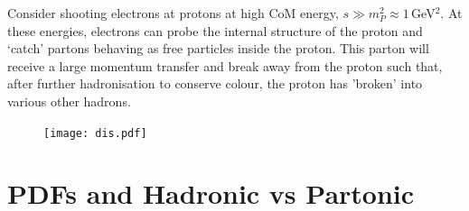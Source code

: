 \documentclass[relqm.tex]{subfiles}
\begin{document}
Consider shooting electrons at protons at high CoM energy, $s\gg m_P^2\approx 1\,$GeV$^2$.
At these energies, electrons can probe the internal structure of the proton and `catch' partons behaving as free particles inside the proton. 
This parton will receive a large momentum transfer and break away from the proton such that, after further hadronisation to conserve colour, the proton has 'broken' into various other hadrons. 
\begin{figure}[H]
    \centering
    \texttt{[image: dis.pdf]}
\end{figure}


\chapter{PDFs and Hadronic vs Partonic}
\end{document}
